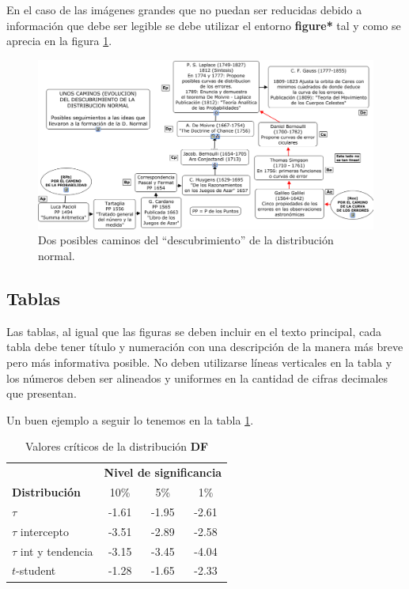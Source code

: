 \documentclass[a4paper,10pt,twoside]{article}
\begin{document}
  En el caso de las imágenes grandes que no puedan ser reducidas debido a información que debe ser legible se debe utilizar el entorno \textbf{figure*} tal y como se aprecia en la figura \ref{fig2}.
  
\begin{figure}
\centering
\includegraphics[scale=0.5,keepaspectratio=true]{./imagenes/dist-normal.png}
\caption{Dos posibles caminos del “descubrimiento” de la 	distribución normal. \citep{Conde2015}}
\label{fig2}
\end{figure}

\subsection{Tablas}

  Las tablas, al igual que las figuras se deben incluir en el texto principal, cada tabla debe tener título y numeración con una descripción de la manera más breve pero más informativa posible. No deben utilizarse líneas verticales en la tabla y  los números deben ser alineados y uniformes en la cantidad de cifras decimales que presentan.
  
  Un buen ejemplo a seguir lo tenemos en la tabla \ref{tabla1}.
  
\begin{table}
\caption{Valores críticos de la distribución \textbf{DF}}
\label{tabla1}
\centering
\begin{tabular}{lccc}
\hline 
 & \multicolumn{3}{c}{\textbf{Nivel de significancia}} \\ 
\textbf{Distribución} & 10\% & 5\% & 1\% \\ 
\hline \hline
$\tau$ & -1.61 & -1.95 & -2.61 \\ 
$\tau$ intercepto & -3.51 & -2.89 & -2.58 \\  
$\tau$ int y tendencia & -3.15 & -3.45 & -4.04 \\  
$t$-student & -1.28 & -1.65 & -2.33 \\ 
\hline 
\end{tabular} 
\end{table}
\end{document}
